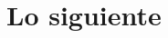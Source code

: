 \documentclass[10pt]{beamer}
\begin{document}

\section{Lo siguiente}
\begin{frame}
\frametitle{}


\end{frame}


\end{document}
